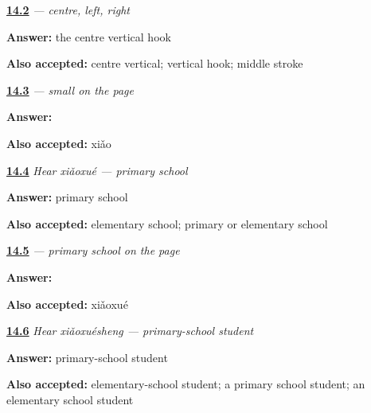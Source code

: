 \noindent\begin{minipage}[t]{\linewidth}
\raggedright
\hyperlink{review-ZH-W14-xiao-order}{\textbf{14.2}} \emph{ — centre, left, right}\par
\small \textbf{Answer:} the centre vertical hook\par
\footnotesize \textbf{Also accepted:} centre vertical; vertical hook; middle stroke
\end{minipage}\par\medskip

\noindent\begin{minipage}[t]{\linewidth}
\raggedright
\hyperlink{review-ZH-C14-xiao-write}{\textbf{14.3}} \emph{ — small on the page}\par
\small \textbf{Answer:} \par
\footnotesize \textbf{Also accepted:}  xiǎo
\end{minipage}\par\medskip

\noindent\begin{minipage}[t]{\linewidth}
\raggedright
\hyperlink{review-ZH-C14-hear-xiaoxue-meaning}{\textbf{14.4}} \emph{Hear \emph{xiǎoxué} — primary school}\par
\small \textbf{Answer:} primary school\par
\footnotesize \textbf{Also accepted:} elementary school; primary or elementary school
\end{minipage}\par\medskip

\noindent\begin{minipage}[t]{\linewidth}
\raggedright
\hyperlink{review-ZH-C14-xiaoxue-write}{\textbf{14.5}} \emph{ — primary school on the page}\par
\small \textbf{Answer:} \par
\footnotesize \textbf{Also accepted:}  xiǎoxué
\end{minipage}\par\medskip

\noindent\begin{minipage}[t]{\linewidth}
\raggedright
\hyperlink{review-ZH-C14-hear-xiaoxuesheng-meaning}{\textbf{14.6}} \emph{Hear \emph{xiǎoxuésheng} — primary-school student}\par
\small \textbf{Answer:} primary-school student\par
\footnotesize \textbf{Also accepted:} elementary-school student; a primary school student; an elementary school student
\end{minipage}\par\medskip

